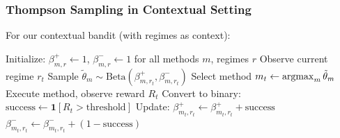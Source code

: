 \documentclass[11pt,a4paper]{article}
\theoremstyle{definition}
\theoremstyle{plain}
\newcommand{\argmax}{\operatornamewithlimits{argmax}}
\begin{document}
\subsubsection{Thompson Sampling in Contextual Setting}

For our contextual bandit (with regimes as context):

\begin{algorithm}[H]
\caption{Contextual Thompson Sampling for Our Setting}
\label{alg:contextual-thompson}
\begin{algorithmic}[1]
\STATE Initialize: $\beta^+_{m,r} \gets 1$, $\beta^-_{m,r} \gets 1$ for all methods $m$, regimes $r$
    \STATE Observe current regime $r_t$
        \STATE Sample $\tilde{\theta}_m \sim \text{Beta}(\beta^+_{m,r_t}, \beta^-_{m,r_t})$
    \ENDFOR
    \STATE Select method $m_t \gets \argmax_m \tilde{\theta}_m$
    \STATE Execute method, observe reward $R_t$
    \STATE Convert to binary: $\text{success} \gets \mathbf{1}[R_t > \text{threshold}]$
    \STATE Update: $\beta^+_{m_t,r_t} \gets \beta^+_{m_t,r_t} + \text{success}$
    \STATE \hspace{1.37cm} $\beta^-_{m_t,r_t} \gets \beta^-_{m_t,r_t} + (1 - \text{success})$
\ENDFOR
\end{algorithmic}
\end{algorithm}
\end{document}
